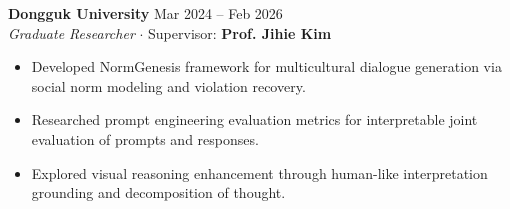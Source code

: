 \documentclass[10pt,letterpaper]{article}
\newcommand{\cvheader}[1]{{\normalsize\bfseries #1}}
\newcommand{\cvposition}[1]{{\itshape #1}}
\newcommand{\cvdate}[1]{\hfill #1}
\begin{document}
\vspace{1pt}
\cvheader{Dongguk University} \cvdate{Mar 2024 -- Feb 2026}\\
\cvposition{Graduate Researcher} $\cdot$ Supervisor: \textbf{Prof. Jihie Kim}
\begin{itemize}
    \item Developed NormGenesis framework for multicultural dialogue generation via social norm modeling and violation recovery.
    \item Researched prompt engineering evaluation metrics for interpretable joint evaluation of prompts and responses.
    \item Explored visual reasoning enhancement through human-like interpretation grounding and decomposition of thought.
\end{itemize}
\end{document}

